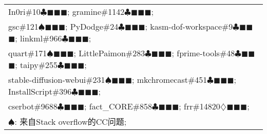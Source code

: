 \begin{table}[htbp]
\begin{tabular}{|l|}
		In0ri\#10{\color{Status2}$\clubsuit$}{\color{Status9}$\blacksquare$}{\color{Status10}$\blacksquare$}{\color{Status5}$\blacksquare$};
		gramine\#1142{\color{Status2}$\clubsuit$}{\color{Status9}$\blacksquare$}{\color{Status10}$\blacksquare$}{\color{Status5}$\blacksquare$};
		\\
		gsc\#121{\color{Status1}$\spadesuit$}{\color{Status9}$\blacksquare$}{\color{Status10}$\blacksquare$}{\color{Status5}$\blacksquare$};
		PyDodge\#24{\color{Status2}$\clubsuit$}{\color{Status9}$\blacksquare$}{\color{Status10}$\blacksquare$}{\color{Status5}$\blacksquare$};
		kasm-dof-workspace\#9{\color{Status2}$\clubsuit$}{\color{Status9}$\blacksquare$}{\color{Status10}$\blacksquare$}{\color{Status5}$\blacksquare$};
		linkml\#966{\color{Status2}$\clubsuit$}{\color{Status9}$\blacksquare$}{\color{Status10}$\blacksquare$}{\color{Status5}$\blacksquare$};
		\\
		\rowcolor[HTML]{EFEFEF}
		quart\#171{\color{Status1}$\spadesuit$}{\color{Status9}$\blacksquare$}{\color{Status10}$\blacksquare$}{\color{Status5}$\blacksquare$};
		LittlePaimon\#283{\color{Status2}$\clubsuit$}{\color{Status9}$\blacksquare$}{\color{Status10}$\blacksquare$}{\color{Status5}$\blacksquare$};
		fprime-tools\#48{\color{Status2}$\clubsuit$}{\color{Status9}$\blacksquare$}{\color{Status10}$\blacksquare$}{\color{Status5}$\blacksquare$};
		taipy\#255{\color{Status2}$\clubsuit$}{\color{Status9}$\blacksquare$}{\color{Status10}$\blacksquare$}{\color{Status5}$\blacksquare$};
		\\
		stable-diffusion-webui\#231{\color{Status1}$\spadesuit$}{\color{Status9}$\blacksquare$}{\color{Status10}$\blacksquare$}{\color{Status5}$\blacksquare$};
		mkchromecast\#451{\color{Status2}$\clubsuit$}{\color{Status9}$\blacksquare$}{\color{Status10}$\blacksquare$}{\color{Status5}$\blacksquare$};
		InstallScript\#396{\color{Status2}$\clubsuit$}{\color{Status9}$\blacksquare$}{\color{Status10}$\blacksquare$}{\color{Status5}$\blacksquare$};
		\\
		\rowcolor[HTML]{EFEFEF}
		cserbot\#9688{\color{Status2}$\clubsuit$}{\color{Status9}$\blacksquare$}{\color{Status10}$\blacksquare$}{\color{Status5}$\blacksquare$};
		fact\_CORE\#858{\color{Status2}$\clubsuit$}{\color{Status9}$\blacksquare$}{\color{Status10}$\blacksquare$}{\color{Status5}$\blacksquare$};
		frr\#14820{\color{Status4}$\diamondsuit$}{\color{Status9}$\blacksquare$}{\color{Status10}$\blacksquare$}{\color{Status5}$\blacksquare$};
		\\
		\hline
		\multicolumn{1}{l}{{\color{Status1}$\spadesuit$}: 来自Stack overflow的CC问题; }\\

\end{tabular}
\end{table}
